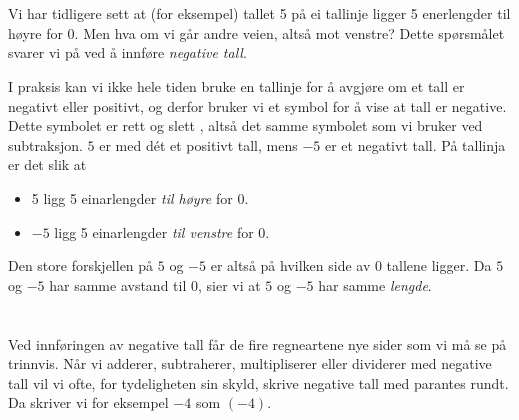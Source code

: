 




\section{\negintro}
Vi har tidligere sett at (for eksempel) tallet 5 på ei tallinje ligger 5 enerlengder til høyre for 0. 
Men hva om vi går andre veien, altså mot venstre? Dette spørsmålet svarer vi på ved å innføre \textit{negative tall}.\regv

\vsk 
I praksis kan vi ikke hele tiden bruke en tallinje for å avgjøre om et tall er negativt eller positivt, og derfor bruker vi et symbol for å vise at tall er negative. Dette symbolet er rett og slett \sym{$ - $}, altså det samme symbolet som vi bruker ved subtraksjon. $ 5 $ er med dét et positivt tall, mens $ -5 $ er et negativt tall. På tallinja er det slik at
\begin{itemize}
	\item 5 ligg 5 einarlengder \textsl{til høyre} for 0.
	\item $ -5 $ ligg 5 einarlengder \textsl{til venstre} for 0.
\end{itemize}
Den store forskjellen på $ 5 $ og $ -5 $ er altså på hvilken side av 0 tallene ligger. Da $ 5 $ og $ -5 $ har samme avstand til 0, sier vi at $ 5 $ og $ -5 $ har samme \textit{lengde}. \regv

\eks[1]{ \vs \vs
\[ |27|=27 \]
}
\eks[2]{ \vs \vs
\[ |-27|=27 \]
}
\newpage
\section{\negrekn \label{rekmneg}}
Ved innføringen av negative tall får de fire regneartene nye sider som vi må se på trinnvis. Når vi adderer, subtraherer, multipliserer eller dividerer med negative tall vil vi ofte, for tydeligheten sin skyld, skrive negative tall med parantes rundt. Da skriver vi for eksempel $ -4 $ som $ (-4) $. 

